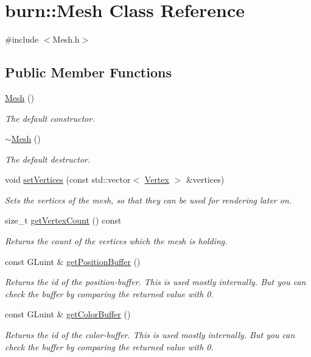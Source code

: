 \hypertarget{classburn_1_1_mesh}{\section{burn\-:\-:Mesh Class Reference}
\label{classburn_1_1_mesh}
}


{\ttfamily \#include $<$Mesh.\-h$>$}

\subsection*{Public Member Functions}
\begin{DoxyCompactItemize}
\item 
\hyperlink{classburn_1_1_mesh_a35d4706a490d0f2bb190b6b785621e07}{Mesh} ()
\begin{DoxyCompactList}\small\item\em The default constructor. \end{DoxyCompactList}\item 
\hyperlink{classburn_1_1_mesh_ad8b2e6283ea14b3943a8945ab7f2d27d}{$\sim$\-Mesh} ()
\begin{DoxyCompactList}\small\item\em The default destructor. \end{DoxyCompactList}\item 
void \hyperlink{classburn_1_1_mesh_ae0996bd5d561cdf7b26e27c713facea7}{set\-Vertices} (const std\-::vector$<$ \hyperlink{classburn_1_1_vertex}{Vertex} $>$ \&vertices)
\begin{DoxyCompactList}\small\item\em Sets the vertices of the mesh, so that they can be used for rendering later on. \end{DoxyCompactList}\item 
size\-\_\-t \hyperlink{classburn_1_1_mesh_a076016c8452ff794880480626394e44c}{get\-Vertex\-Count} () const 
\begin{DoxyCompactList}\small\item\em Returns the count of the vertices which the mesh is holding. \end{DoxyCompactList}\item 
const G\-Luint \& \hyperlink{classburn_1_1_mesh_ac1f545b97bac2463ac0c833e23cd4779}{get\-Position\-Buffer} ()
\begin{DoxyCompactList}\small\item\em Returns the id of the position-\/buffer. This is used mostly internally. But you can check the buffer by comparing the returned value with 0. \end{DoxyCompactList}\item 
const G\-Luint \& \hyperlink{classburn_1_1_mesh_aaf8e759004d7c8203c79b52418d5b426}{get\-Color\-Buffer} ()
\begin{DoxyCompactList}\small\item\em Returns the id of the color-\/buffer. This is used mostly internally. But you can check the buffer by comparing the returned value with 0. \end{DoxyCompactList}\end{DoxyCompactItemize}


